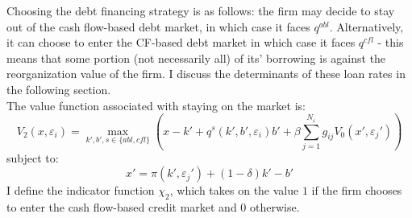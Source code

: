 \documentclass[12pt]{article}
\begin{document}
Choosing the debt financing strategy is as follows: the firm may decide to stay out of the cash flow-based debt market, in which case it faces $q^{abl}$. Alternatively, it can choose to enter the CF-based debt market in which case it faces $q^{cfl}$ - this means that some portion (not necessarily all) of its' borrowing is against the reorganization value of the firm. I discuss the determinants of these loan rates in the following section. \\
\newpage
\noindent The value function associated with staying on the market is: 
\begin{equation} \label{eq:V_2}
V_2(x,\varepsilon_i) = \max_{k',b', s \in \{abl, cfl \}} \left(x - k' +  q^s(k',b',\varepsilon_i)b' + \beta \sum_{j=1}^{N_\varepsilon} g_{ij} V_0(x',\varepsilon_j') \right)
\end{equation}
subject to: 
\begin{equation} \label{eq:cont_1}
x' = \pi(k',\varepsilon_j')+(1-\delta)k'-b'
\end{equation}
I define the indicator function $\chi_2$, which takes on the value $1$ if the firm chooses to enter the cash flow-based credit market and 0 otherwise. 
\end{document}
